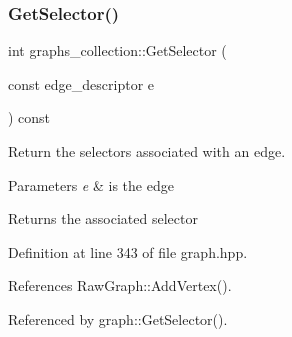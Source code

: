 \subsubsection{\texorpdfstring{Get\+Selector()}{GetSelector()}}
{\footnotesize\ttfamily int graphs\+\_\+collection\+::\+Get\+Selector (\begin{DoxyParamCaption}\item[{const edge\+\_\+descriptor}]{e }\end{DoxyParamCaption}) const\hspace{0.3cm}{\ttfamily [inline]}}



Return the selectors associated with an edge. 


\begin{DoxyParams}{Parameters}
{\em e} & is the edge \\
\hline
\end{DoxyParams}
\begin{DoxyReturn}{Returns}
the associated selector 
\end{DoxyReturn}


Definition at line 343 of file graph.\+hpp.



References Raw\+Graph\+::\+Add\+Vertex().



Referenced by graph\+::\+Get\+Selector().

